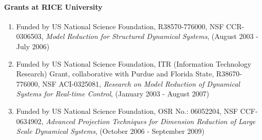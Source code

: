 
\paragraph{Grants at RICE University}
\begin{enumerate}
\item
Funded by US National Science Foundation, R38570-776000, NSF CCR-0306503, \emph {Model
  Reduction for Structured Dynamical Systems}, (August 2003 - July 2006)

\item
Funded by US National Science Foundation,  ITR (Information Technology Research) Grant,
collaborative with Purdue and Florida State, R38670-776000, NSF ACI-0325081, \emph
{Research on Model Reduction of Dynamical Systems for Real-time Control}, (January 2003 -
August 2007)

\item
Funded by US National Science Foundation, OSR No.: 06052204, NSF CCF-0634902,
\emph{Advanced Projection Techniques for Dimension Reduction of Large Scale Dynamical
  Systems}, (October 2006 - September 2009)

\end{enumerate}




